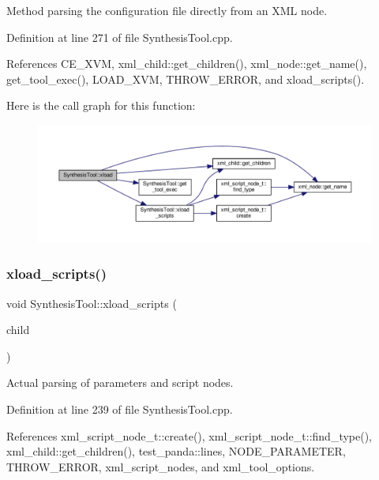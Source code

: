 Method parsing the configuration file directly from an X\+ML node. 



Definition at line 271 of file Synthesis\+Tool.\+cpp.



References C\+E\+\_\+\+X\+VM, xml\+\_\+child\+::get\+\_\+children(), xml\+\_\+node\+::get\+\_\+name(), get\+\_\+tool\+\_\+exec(), L\+O\+A\+D\+\_\+\+X\+VM, T\+H\+R\+O\+W\+\_\+\+E\+R\+R\+OR, and xload\+\_\+scripts().

Here is the call graph for this function\+:
\nopagebreak
\begin{figure}[H]
\begin{center}
\leavevmode
\includegraphics[width=350pt]{d9/de0/classSynthesisTool_a7f73cdb803166570cad3f9959188cf4f_cgraph}
\end{center}
\end{figure}
\mbox{\label{classSynthesisTool_a4ab567e999004b7d1c798115f548eb46}} 
\subsubsection{\texorpdfstring{xload\+\_\+scripts()}{xload\_scripts()}}
{\footnotesize\ttfamily void Synthesis\+Tool\+::xload\+\_\+scripts (\begin{DoxyParamCaption}\item[{const \hyperlink{classxml__element}{xml\+\_\+element} $\ast$}]{child }\end{DoxyParamCaption})}



Actual parsing of parameters and script nodes. 



Definition at line 239 of file Synthesis\+Tool.\+cpp.



References xml\+\_\+script\+\_\+node\+\_\+t\+::create(), xml\+\_\+script\+\_\+node\+\_\+t\+::find\+\_\+type(), xml\+\_\+child\+::get\+\_\+children(), test\+\_\+panda\+::lines, N\+O\+D\+E\+\_\+\+P\+A\+R\+A\+M\+E\+T\+ER, T\+H\+R\+O\+W\+\_\+\+E\+R\+R\+OR, xml\+\_\+script\+\_\+nodes, and xml\+\_\+tool\+\_\+options.



